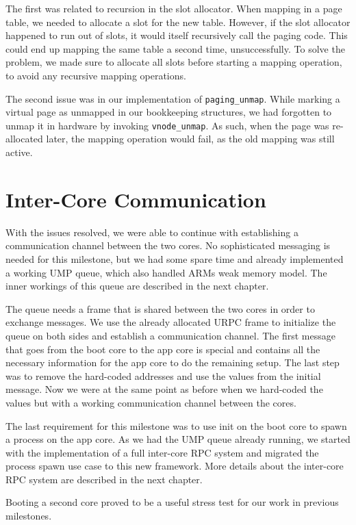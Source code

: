 The first was related to recursion in the slot allocator.
When mapping in a page table, we needed to allocate a slot for the new table.
However, if the slot allocator happened to run out of slots, it would itself recursively call the paging code.
This could end up mapping the same table a second time, unsuccessfully.
To solve the problem, we made sure to allocate all slots before starting a mapping operation, to avoid any recursive mapping operations.

The second issue was in our implementation of \verb|paging_unmap|.
While marking a virtual page as unmapped in our bookkeeping structures, we had forgotten to unmap it in hardware by invoking \verb|vnode_unmap|.
As such, when the page was re-allocated later, the mapping operation would fail, as the old mapping was still active.

\section{Inter-Core Communication}

With the issues resolved, we were able to continue with establishing a communication channel between the two cores.
No sophisticated messaging is needed for this milestone, but we had some spare time and already implemented
a working UMP queue, which also handled ARMs weak memory model. The inner workings of this queue are described in  
the next chapter.

The queue needs a frame that is shared between the two cores in order to exchange messages. We use the already allocated
URPC frame to initialize the queue on both sides and establish a communication channel. The first message that goes from
the boot core to the app core is special and contains all the necessary information for the app core to do the remaining
setup. The last step was to remove the hard-coded addresses and use the values from the initial message. Now we were at
the same point as before when we hard-coded the values but with a working communication channel between the cores.

The last requirement for this milestone was to use init on the boot core to spawn a process on the app core. As we had the
UMP queue already running, we started with the implementation of a full inter-core RPC system and migrated the process spawn
use case to this new framework. More details about the inter-core RPC system are described in the next chapter.

Booting a second core proved to be a useful stress test for our work in previous milestones.
